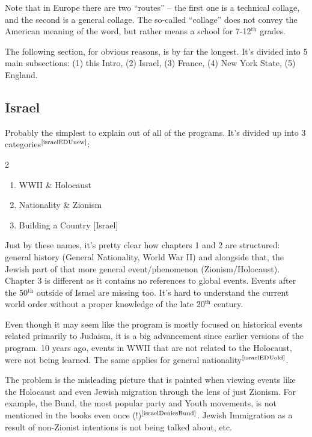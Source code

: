 \documentclass[12pt]{article}
\newcommand\mc[1]  {$^{\text{\cite{#1}}}$}
\begin{document}
	Note that in Europe there are two ``routes'' -- the first one is a technical collage, and the second is a general collage. The so-called ``collage'' does not convey the American meaning of the word, but rather means a school for 7-12$^{\text{th}}$ grades. 
	
	The following section, for obvious reasons, is by far the longest. It's divided into 5 main subsections: (1) this Intro, (2) Israel, (3) France, (4) New York State, (5) England. 
	
	\subsection{Israel}
	Probably the simplest to explain out of all of the programs. It's divided up into 3 categories\mc{israelEDUnew}: 
	\begin{multicols}{2}
		\begin{enumerate}
			\item WWII \& Holocaust
			\item Nationality \& Zionism
			\item Building a Country [Israel]
		\end{enumerate}
	\end{multicols}
	Just by these names, it's pretty clear how chapters 1 and 2 are structured: general history (General Nationality, World War II) and alongside that, the Jewish part of that more general event/phenomenon (Zionism/Holocaust). Chapter 3 is different as it contains no references to global events. Events after the 50$^{\text{th}}$ outside of Israel are missing too. It's hard to understand the current world order without a proper knowledge of the late 20$^{\text{th}}$ century. 
	
	Even though it may seem like the program is mostly focused on historical events related primarily to Judaism, it is a big advancement since earlier versions of the program. 10 years ago, events in WWII that are not related to the Holocaust, were not being learned. The same applies for general nationality\mc{israelEDUold}. 
	
	The problem is the misleading picture that is painted when viewing events like the Holocaust and even Jewish migration through the lens of just Zionism. For example, the Bund, the most popular party and Youth movements, is not mentioned in the books even once (!)\mc{israelDeniesBund}. Jewish Immigration as a result of non-Zionist intentions is not being talked about, etc. 
	
	
\end{document}
